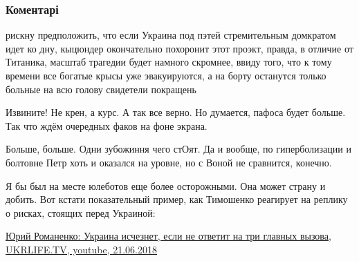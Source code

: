  
 
 
 
 
\subsubsection{Коментарі}

\begin{itemize} %

рискну предположить, что если Украина под пэтей стремительным домкратом идет ко
дну, кыцюндер окончательно похоронит этот проэкт, правда, в отличие от
Титаника, масштаб трагедии будет намного скромнее, ввиду того, что к тому времени
все богатые крысы уже эвакуируются, а на борту останутся только больные на всю
голову свидетели покращень


Извините! Не крен, а курс. А так все верно. Но думается, пафоса будет больше. Так что ждём очередных факов на фоне экрана.


Больше, больше. Одни зубожиння чего стОят. Да и вообще, по гиперболизации и
болтовне Петр хоть и оказался на уровне, но с Воной не сравнится, конечно.


Я бы был на месте юлеботов еще более осторожными. Она может страну и добить.
Вот кстати показательный пример, как Тимошенко реагирует на реплику о рисках,
стоящих перед Украиной: 

\href{https://www.youtube.com/watch?v=qSjCyrDKu-4&t=322s}{%
Юрий Романенко: Украина исчезнет, если не ответит на три главных вызова, %
UKRLIFE.TV, youtube, 21.06.2018%
}

\end{itemize} %
